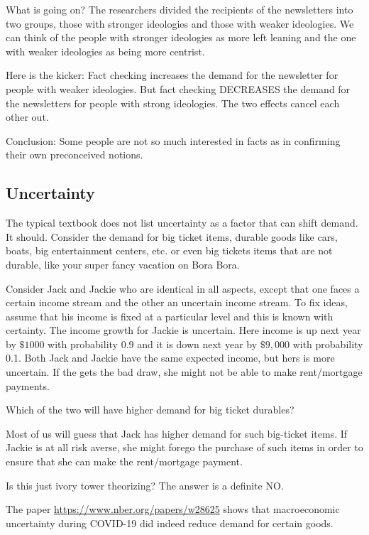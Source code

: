 \documentclass[
]{book}
\begin{document}
What is going on? The researchers divided the recipients of the newsletters into two groups, those with stronger ideologies and those with weaker ideologies. We can think of the people with stronger ideologies as more left leaning and the one with weaker ideologies as being more centrist.

Here is the kicker: Fact checking increases the demand for the newsletter for people with weaker ideologies. But fact checking DECREASES the demand for the newsletters for people with strong ideologies. The two effects cancel each other out.

Conclusion: Some people are not so much interested in facts as in confirming their own preconceived notions.

\hypertarget{uncertainty}{%
\subsection{Uncertainty}\label{uncertainty}}

The typical textbook does not list uncertainty as a factor that can shift demand. It should. Consider the demand for big ticket items, durable goods like cars, boats, big entertainment centers, etc. or even big tickets items that are not durable, like your super fancy vacation on Bora Bora.

Consider Jack and Jackie who are identical in all aspects, except that one faces a certain income stream and the other an uncertain income stream. To fix ideas, assume that his income is fixed at a particular level and this is known with certainty. The income growth for Jackie is uncertain. Here income is up next year by \(\$1000\) with probability 0.9 and it is down next year by \(\$9,000\) with probability 0.1. Both Jack and Jackie have the same expected income, but hers is more uncertain. If the gets the bad draw, she might not be able to make rent/mortgage payments.

Which of the two will have higher demand for big ticket durables?

Most of us will guess that Jack has higher demand for such big-ticket items. If Jackie is at all risk averse, she might forego the purchase of such items in order to ensure that she can make the rent/mortgage payment.

Is this just ivory tower theorizing? The answer is a definite NO.

The paper \url{https://www.nber.org/papers/w28625} shows that macroeconomic uncertainty during COVID-19 did indeed reduce demand for certain goods.
\end{document}
